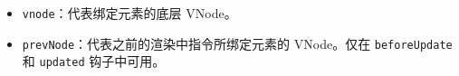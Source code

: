 \begin{paracol}{2}
\begin{itemize}
\begin{itemize}
      \texttt{value}：传递给指令的值。例如在
      \texttt{v-my-directive="1\ +\ 1"} 中，值是 \texttt{2}。
    \item
      \texttt{oldValue}：之前的值，仅在 \texttt{beforeUpdate} 和
      \texttt{updated} 中可用。无论值是否更改，它都可用。
    \item
      \texttt{arg}：传递给指令的参数 (如果有的话)。例如在
      \texttt{v-my-directive:foo} 中，参数是 \texttt{"foo"}。
    \item
      \texttt{modifiers}：一个包含修饰符的对象 (如果有的话)。例如在
      \texttt{v-my-directive.foo.bar} 中，修饰符对象是
      \texttt{\{\ foo:\ true,\ bar:\ true\ \}}。
    \item
      \texttt{instance}：使用该指令的组件实例。
    \item
      \texttt{dir}：指令的定义对象。
    \end{itemize}
  \item
    \texttt{vnode}：代表绑定元素的底层 VNode。
  \item
    \texttt{prevNode}：代表之前的渲染中指令所绑定元素的 VNode。仅在
    \texttt{beforeUpdate} 和 \texttt{updated} 钩子中可用。
  \end{itemize}
\end{paracol}

